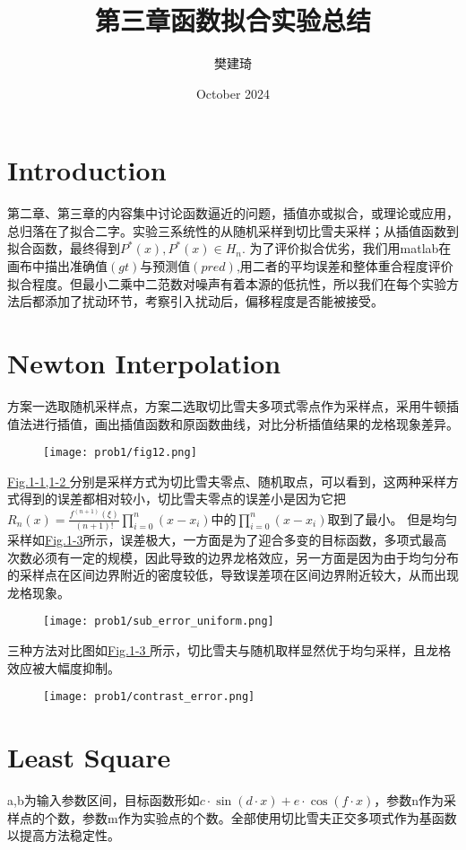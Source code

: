 \documentclass{article}
\title{第三章函数拟合实验总结}
\author{樊建琦}
\date{October 2024}
\begin{document}
\maketitle

\section{Introduction}
第二章、第三章的内容集中讨论函数逼近的问题，插值亦或拟合，或理论或应用，总归落在了拟合二字。实验三系统性的从随机采样到切比雪夫采样；从插值函数到拟合函数，最终得到$P^{*}(x),P^{*}(x) \in H_{n}$. 为了评价拟合优劣，我们用matlab在画布中描出准确值$(gt)$与预测值$(pred)$,用二者的平均误差和整体重合程度评价拟合程度。但最小二乘中二范数对噪声有着本源的低抗性，所以我们在每个实验方法后都添加了扰动环节，考察引入扰动后，偏移程度是否能被接受。
\section{Newton Interpolation}
方案一选取随机采样点，方案二选取切比雪夫多项式零点作为采样点，采用牛顿插值法进行插值，画出插值函数和原函数曲线，对比分析插值结果的龙格现象差异。
\begin{figure}
    \centering
    \texttt{[image: prob1/fig12.png]}
    \label{fig:cheb_random}
\end{figure}
\hyperref[fig:cheb_random]{Fig.1-1,1-2 }分别是采样方式为切比雪夫零点、随机取点，可以看到，这两种采样方式得到的误差都相对较小，切比雪夫零点的误差小是因为它把$R_n(x) = \frac{f^{(n+1)}(\xi)}{(n+1)!} \prod_{i=0}^{n} (x - x_i)$中的$\prod_{i=0}^{n} (x - x_i)$取到了最小。
但是均匀采样如\hyperref[fig:uniform]{Fig.1-3}所示，误差极大，一方面是为了迎合多变的目标函数，多项式最高次数必须有一定的规模，因此导致的边界龙格效应，另一方面是因为由于均匀分布的采样点在区间边界附近的密度较低，导致误差项在区间边界附近较大，从而出现龙格现象。 
\begin{figure}[H]
    \centering
    \texttt{[image: prob1/sub\_error\_uniform.png]}
    \label{fig:uniform}
\end{figure}
三种方法对比图如\hyperref[fig:contrast]{Fig.1-3 }所示，切比雪夫与随机取样显然优于均匀采样，且龙格效应被大幅度抑制。
\begin{figure}[H]
    \centering
    \texttt{[image: prob1/contrast\_error.png]}
    \label{fig:contrast}
\end{figure}
\clearpage

\section{Least Square}
a,b为输入参数区间，目标函数形如$c \cdot \sin(d \cdot x) + e \cdot \cos(f \cdot x)$，参数n作为采样点的个数，参数m作为实验点的个数。全部使用切比雪夫正交多项式作为基函数以提高方法稳定性。
\end{document}
